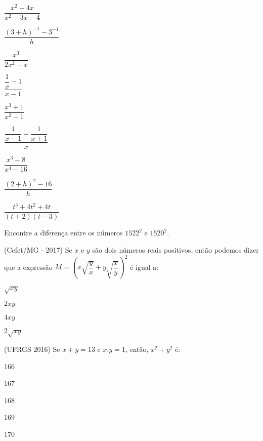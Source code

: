 \begin{secExercicios}
\begin{exer}
\begin{enumerate}[a)]
\begin{multicols}{2}
        \item $\dfrac{x^2 -4x}{x^2 - 3x - 4}$
  
        \item $\dfrac{(3 + h)^{-1} - 3^{-1}}{h}$
  
        \item $\dfrac{x^3}{2x^2 - x}$
  
        \item $\dfrac{\dfrac{1}{x} - 1}{x-1}$
  
        \item $\dfrac{x^3 + 1}{x^2 - 1}$
  
        \item $\dfrac{\dfrac{1}{x-1} + \dfrac{1}{x+1}}{x}$
  
        \item $\dfrac{x^3 - 8}{x^4 - 16}$
        \item $\dfrac{(2+h)^2 - 16}{h}$
        \item $\dfrac{t^3 + 4t^2 + 4t}{(t+2)(t-3)}$
  \end{multicols}\end{enumerate}  
\end{exer}

\begin{exer}
  Encontre a diferença entre os números $1522^2$ e $1520^2$.  
\end{exer}

\begin{exer}  
  (Cefet/MG - 2017) Se $x$ e $y$ são dois números reais positivos, então podemos dizer que a expressão $M = \left(x\sqrt{\dfrac{y}{x}} + y\sqrt{\dfrac{x}{y}}\right)^2$ é igual a:
  \begin{enumerate}[a)]\begin{multicols}{4}
  \item $\sqrt{xy}$
  \item $2xy$
  \item $4xy$
  \item $2\sqrt{xy}$
  \end{multicols}\end{enumerate}
\end{exer}
\begin{exer}
  (UFRGS 2016) Se $x + y = 13$ e $x. y = 1$, então, $x^2 + y^2$ é:
  \begin{enumerate}[a)]\begin{multicols}{5}
  \item 166
  \item 167
  \item 168
  \item 169
  \item 170
  \end{multicols} \end{enumerate}
\end{exer}


\end{secExercicios}
